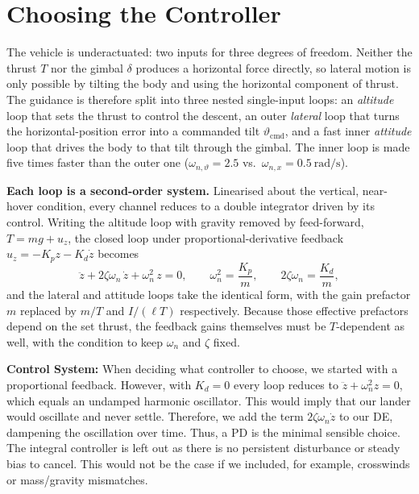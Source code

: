 \documentclass[11pt]{article}
\begin{document}
\section*{Choosing the Controller}

The vehicle is underactuated: two inputs for three degrees of freedom. Neither the thrust $T$ nor the gimbal $\delta$ produces a horizontal force directly, so lateral motion is only possible by tilting the body and using the horizontal component of thrust. The guidance is therefore split into three nested single-input loops: an \emph{altitude} loop that sets the thrust to control the descent, an outer \emph{lateral} loop that turns the horizontal-position error into a commanded tilt $\vartheta_{\mathrm{cmd}}$, and a fast inner \emph{attitude} loop that drives the body to that tilt through the gimbal. The inner loop is made five times faster than the outer one ($\omega_{n,\vartheta}=2.5$ vs.\ $\omega_{n,x}=0.5~\mathrm{rad/s}$).

\textbf{Each loop is a second-order system.} Linearised about the vertical, near-hover condition, every channel reduces to a double integrator driven by its control. Writing the altitude loop with gravity removed by feed-forward, $T = mg + u_z$, the closed loop under proportional-derivative feedback $u_z = -K_p z - K_d \dot z$ becomes \begin{equation}   \ddot z + 2\zeta\omega_n\,\dot z + \omega_n^2\,z = 0,   \qquad \omega_n^2 = \frac{K_p}{m}, \qquad 2\zeta\omega_n = \frac{K_d}{m}, \end{equation} and the lateral and attitude loops take the identical form, with the gain prefactor $m$ replaced by $m/T$ and $I/(\ell T)$ respectively. Because those effective prefactors depend on the set thrust, the feedback gains themselves must be $T$-dependent as well, with the condition to keep $\omega_n$ and $\zeta$ fixed.  

\textbf{Control System:} When deciding what controller to choose, we started with a proportional feedback. However, with $K_d=0$ every loop reduces to $\ddot z + \omega_n^2 z = 0$, which equals an undamped harmonic oscillator. This would imply that our lander would oscillate and never settle. Therefore, we add the term $2\zeta\omega_n\dot z$ to our DE, dampening the oscillation over time. Thus, a PD is the minimal sensible choice. The integral controller is left out as there is no persistent disturbance or steady bias to cancel. This would not be the case if we included, for example, crosswinds or mass/gravity mismatches.
\end{document}
